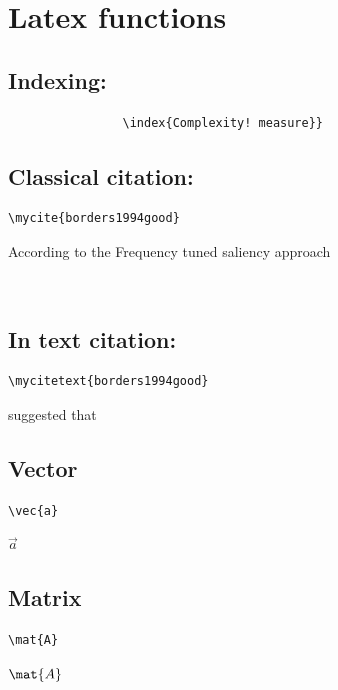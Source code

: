 \chapter*{Latex functions}


\section*{Indexing:} 
            \begin{verbatim}
                \index{Complexity! measure}}
            \end{verbatim}


\section*{Classical citation:} \begin{verbatim}\mycite{borders1994good}\end{verbatim}
        According to the Frequency tuned saliency approach 
        
~\\        
\section*{In text citation:} \begin{verbatim}\mycitetext{borders1994good}\end{verbatim}
 suggested that


\section*{Vector} \begin{verbatim}\vec{a}\end{verbatim}
$\vec{a}$

\section*{Matrix}\begin{verbatim}\mat{A}\end{verbatim}
$\mat{A}$



        

